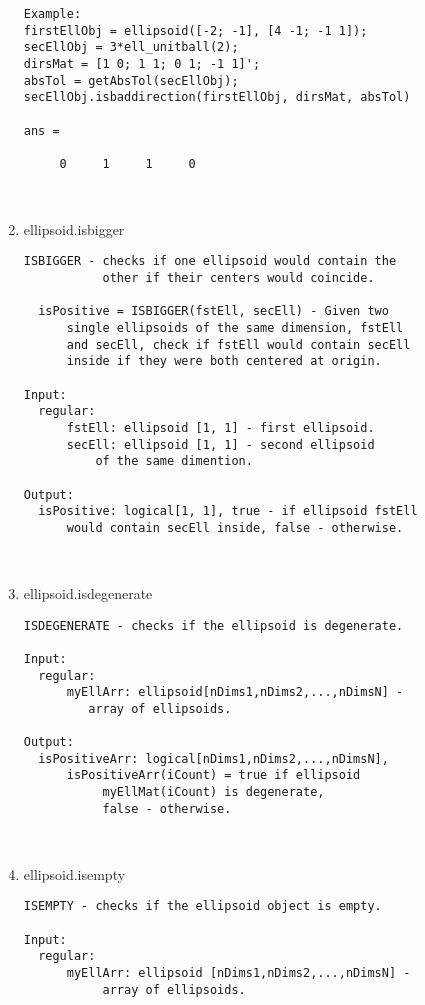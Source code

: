 \begin{enumerate}
\begin{lstlisting}
Example:
firstEllObj = ellipsoid([-2; -1], [4 -1; -1 1]);
secEllObj = 3*ell_unitball(2);
dirsMat = [1 0; 1 1; 0 1; -1 1]';
absTol = getAbsTol(secEllObj);
secEllObj.isbaddirection(firstEllObj, dirsMat, absTol)

ans =

     0     1     1     0



\end{lstlisting}
\fontfamily{\familydefault}
\selectfont
\item {ellipsoid.isbigger}
\selectfont
\begin{lstlisting}
ISBIGGER - checks if one ellipsoid would contain the
           other if their centers would coincide.

  isPositive = ISBIGGER(fstEll, secEll) - Given two
      single ellipsoids of the same dimension, fstEll
      and secEll, check if fstEll would contain secEll
      inside if they were both centered at origin.

Input:
  regular:
      fstEll: ellipsoid [1, 1] - first ellipsoid.
      secEll: ellipsoid [1, 1] - second ellipsoid
          of the same dimention.

Output:
  isPositive: logical[1, 1], true - if ellipsoid fstEll
      would contain secEll inside, false - otherwise.



\end{lstlisting}
\fontfamily{\familydefault}
\selectfont
\item {ellipsoid.isdegenerate}
\selectfont
\begin{lstlisting}
ISDEGENERATE - checks if the ellipsoid is degenerate.

Input:
  regular:
      myEllArr: ellipsoid[nDims1,nDims2,...,nDimsN] -
         array of ellipsoids.

Output:
  isPositiveArr: logical[nDims1,nDims2,...,nDimsN],
      isPositiveArr(iCount) = true if ellipsoid
           myEllMat(iCount) is degenerate,
           false - otherwise.



\end{lstlisting}
\fontfamily{\familydefault}
\selectfont
\item {ellipsoid.isempty}
\selectfont
\begin{lstlisting}
ISEMPTY - checks if the ellipsoid object is empty.

Input:
  regular:
      myEllArr: ellipsoid [nDims1,nDims2,...,nDimsN] -
           array of ellipsoids.


\end{lstlisting}
\end{enumerate}
